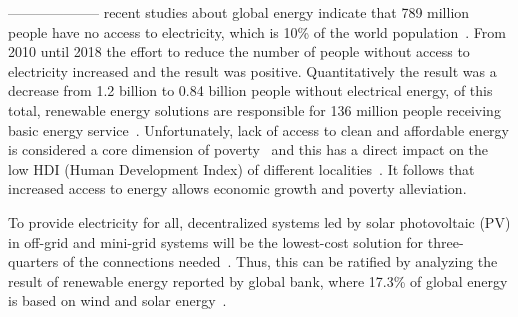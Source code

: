 \documentclass[10pt,journal,compsoc]{IEEEtran}
\begin{document}
\maketitle

%
\IEEEpeerreviewmaketitle



% 
% 
% 
% 
--------------------
\color{blue} 
 recent studies about global energy indicate that 789 million people have no access to electricity, which is 10\% of the world population~\cite{Energyprogressreport}. From 2010 until 2018 the effort to reduce the number of people without access to electricity increased and the result was positive. Quantitatively the result was a decrease from 1.2 billion to 0.84 billion people without electrical energy, of this total, renewable energy solutions are responsible for 136 million people receiving basic energy service~\cite{Energyprogressreport}. Unfortunately, lack of access to clean and affordable energy is considered a core dimension of poverty~\cite{Hussein2012} and this has a direct impact on the low HDI (Human Development Index) of different localities~\cite{Coelho}. It follows that increased access to energy allows economic growth and poverty alleviation\cite{Karekesi}. 

To provide electricity for all, decentralized systems led by solar photovoltaic (PV) in off-grid and mini-grid systems will be the lowest-cost solution for three-quarters of the connections needed~\cite{Hussein2012}. Thus, this can be ratified by analyzing the result of renewable energy reported by global bank, where 17.3\%  of global energy is based on wind and solar energy~\cite{Energyprogressreport}.
\end{document}
